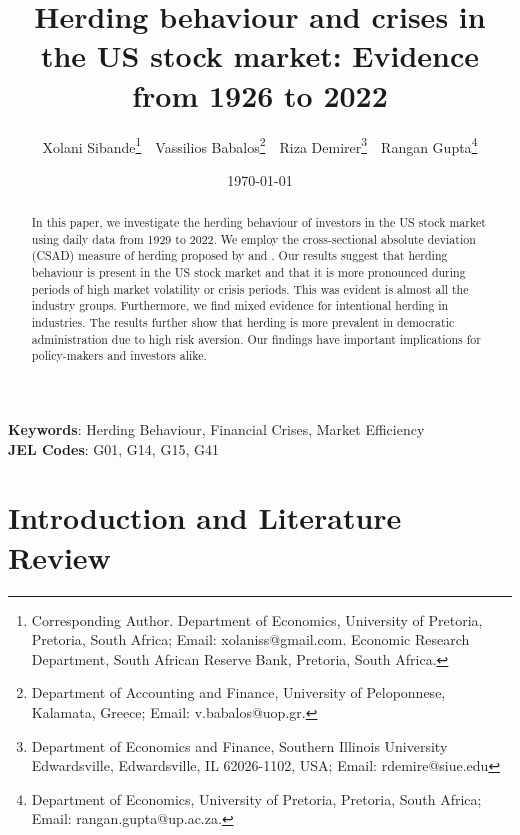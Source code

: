 \documentclass[
  letterpaper,
  DIV=11,
  numbers=noendperiod]{scrartcl}
\author{}
\date{}
\begin{document}
\title{Herding behaviour and crises in the US stock market: Evidence from 1926 to 2022}


\author { Xolani Sibande\footnote{Corresponding Author. Department of Economics, University of Pretoria, Pretoria, South Africa; Email: xolaniss@gmail.com. Economic Research Department, South African Reserve Bank, Pretoria, South Africa.} \,\, 
Vassilios Babalos\footnote{Department of Accounting and Finance, University of Peloponnese, Kalamata,  Greece; Email: v.babalos@uop.gr.} \,\,
Riza Demirer\footnote{Department of Economics and Finance, Southern Illinois University Edwardsville, Edwardsville, IL 62026-1102, USA; Email: rdemire@siue.edu} \,\,
Rangan Gupta\footnote{Department of Economics, University of Pretoria, Pretoria, South Africa; Email: rangan.gupta@up.ac.za.}
}
\date{\today}
\maketitle

\begin{abstract}

In this paper, we investigate the herding behaviour of investors in the US stock market using daily data from 1929 to 2022. We employ the cross-sectional absolute deviation (CSAD) measure of herding proposed by \cite{christie1995following} and \cite{chang2000examination}. Our results suggest that herding behaviour is present in the US stock market and that it is more pronounced during periods of high market volatility or crisis periods. This was evident is almost all the industry groups. Furthermore,  we find mixed evidence for intentional herding in industries. The results further show that herding is more prevalent in democratic administration due to high risk aversion. Our findings have important implications for policy-makers and investors alike. 

\end{abstract}

\noindent\textbf{Keywords}: Herding Behaviour, Financial Crises, Market Efficiency
\\
\textbf{JEL Codes}: G01, G14, G15, G41
\newpage

\section{Introduction and Literature
Review}\label{introduction-and-literature-review}
\end{document}
